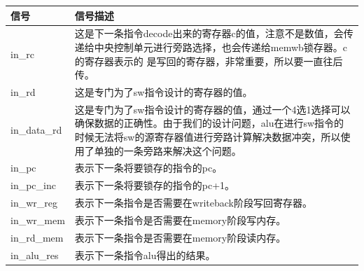 \begin{center}
    \label{table:alumem}
    \begin{longtable}{p{}p{}}
        \toprule
        信号 & 信号描述 \\
        \midrule
        in\_rc &  这是下一条指令decode出来的寄存器c的值，注意不是数值，会传递给中央控制单元进行旁路选择，也会传递给memwb锁存器。c的寄存器表示的
        是写回的寄存器，非常重要，所以要一直往后传。\\
        in\_rd & 这是专门为了sw指令设计的寄存器的值。\\
        in\_data\_rd & 这是专门为了sw指令设计的寄存器的值，通过一个4️选1选择可以确保数据的正确性。由于我们的设计问题，alu在进行sw指令的时候无法将sw的源寄存器值进行旁路计算解决数据冲突，所以使用了单独的一条旁路来解决这个问题。\\
        in\_pc &  表示下一条将要锁存的指令的pc。\\
        in\_pc\_inc &  表示下一条将要锁存的指令的pc+1。\\
        in\_wr\_reg &  表示下一条指令是否需要在writeback阶段写回寄存器。\\
        in\_wr\_mem &  表示下一条指令是否需要在memory阶段写内存。\\
        in\_rd\_mem &  表示下一条指令是否需要在memory阶段读内存。\\
        in\_alu\_res & 表示下一条指令alu得出的结果。\\



\end{longtable}
\end{center}
